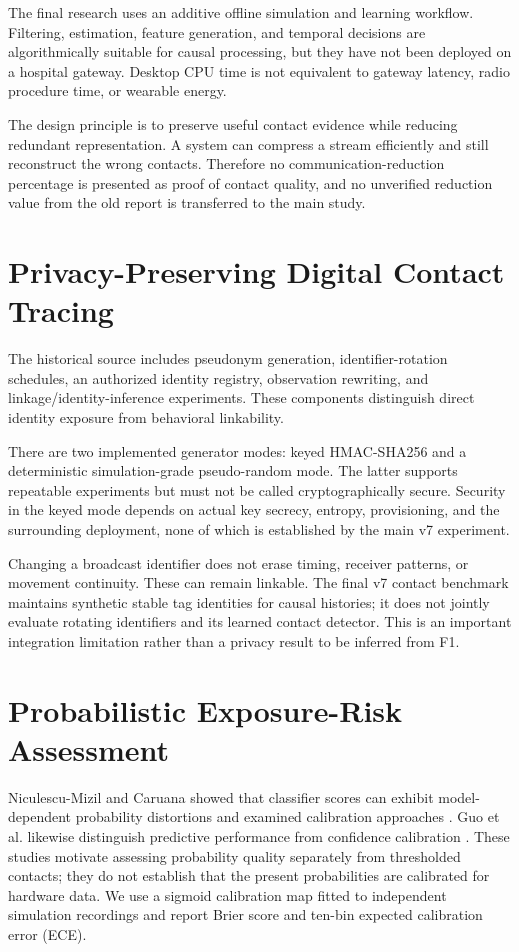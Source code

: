 \documentclass[12pt,a4paper]{report}
\begin{document}
The final research uses an additive offline simulation and learning workflow. Filtering, estimation, feature generation, and temporal decisions are algorithmically suitable for causal processing, but they have not been deployed on a hospital gateway. Desktop CPU time is not equivalent to gateway latency, radio procedure time, or wearable energy.

The design principle is to preserve useful contact evidence while reducing redundant representation. A system can compress a stream efficiently and still reconstruct the wrong contacts. Therefore no communication-reduction percentage is presented as proof of contact quality, and no unverified reduction value from the old report is transferred to the main study.

\section{Privacy-Preserving Digital Contact Tracing}
The historical source includes pseudonym generation, identifier-rotation schedules, an authorized identity registry, observation rewriting, and linkage/identity-inference experiments. These components distinguish direct identity exposure from behavioral linkability.

There are two implemented generator modes: keyed HMAC-SHA256 and a deterministic simulation-grade pseudo-random mode. The latter supports repeatable experiments but must not be called cryptographically secure. Security in the keyed mode depends on actual key secrecy, entropy, provisioning, and the surrounding deployment, none of which is established by the main v7 experiment.

Changing a broadcast identifier does not erase timing, receiver patterns, or movement continuity. These can remain linkable. The final v7 contact benchmark maintains synthetic stable tag identities for causal histories; it does not jointly evaluate rotating identifiers and its learned contact detector. This is an important integration limitation rather than a privacy result to be inferred from F1.

\section{Probabilistic Exposure-Risk Assessment}
Niculescu-Mizil and Caruana showed that classifier scores can exhibit model-dependent probability distortions and examined calibration approaches \cite{ref7}. Guo et al. likewise distinguish predictive performance from confidence calibration \cite{ref8}. These studies motivate assessing probability quality separately from thresholded contacts; they do not establish that the present probabilities are calibrated for hardware data. We use a sigmoid calibration map fitted to independent simulation recordings and report Brier score and ten-bin expected calibration error (ECE).
\end{document}
